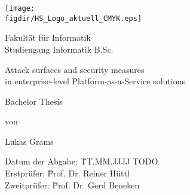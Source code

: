 \begin{titlepage}

\sffamily

\raggedleft

\vspace*{-2cm}

\texttt{[image: \\figdir/HS\_Logo\_aktuell\_CMYK.eps]}

\vfill

\centering
\Huge
Fakultät für Informatik  \vspace{0.5cm}\\
\Large
Studiengang Informatik B.Sc.

\Huge
Attack surfaces and security measures \\
in enterprise-level Platform-as-a-Service solutions

\vspace{2cm}

\Large
Bachelor Thesis


\vspace{1.5cm}

\Large
von

\vspace{0.5cm}

\LARGE
Lukas Grams

\vspace{1cm}

\flushleft
 \Large
\vspace*{\fill}

\begin{tabbing}
Datum der Abgabe: \= TT.MM.JJJJ TODO \\ 
Erstprüfer: \= Prof. Dr. Reiner Hüttl \\
Zweitprüfer: \= Prof. Dr. Gerd Beneken \\
\end{tabbing}

\end{titlepage}


\cleardoubleemptypage


